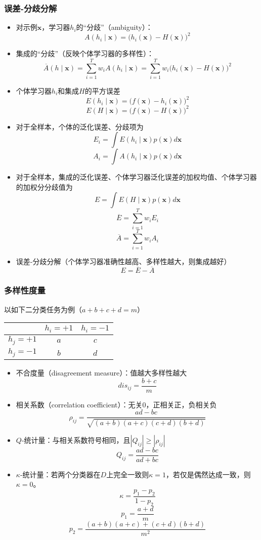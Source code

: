 \documentclass{ctexart}
\begin{document}
 					\subsubsection{误差-分歧分解}
 						\begin{itemize}
 							\item 对示例$\bm{x}$，学习器$h_i$的``分歧''（ambiguity）：\[A(h_i\mid\bm{x})=\big(h_i(\bm{x})-H(\bm{x})\big)^2\]
 							\item 集成的``分歧''（反映个体学习器的多样性）：\[\overline{A}(h\mid\bm{x})=\sum_{i=1}^{T}w_iA(h_i\mid\bm{x})=\sum_{i=1}^{T}w_i\big(h_i(\bm{x})-H(\bm{x})\big)^2\]
 							\item 个体学习器$h_i$和集成$H$的平方误差\[E(h_i\mid\bm{x})=\big(f(\bm{x})-h_i(\bm{x})\big)^2\]\[E(H\mid\bm{x})=\big(f(\bm{x})-H(\bm{x})\big)^2\]
 							\item 对于全样本，个体的泛化误差、分歧项为\[E_i=\int E(h_i\mid\bm{x})p(\bm{x})d\bm{x}\]\[A_i=\int A(h_i\mid\bm{x})p(\bm{x})d\bm{x}\]
 							\item 对于全样本，集成的泛化误差、个体学习器泛化误差的加权均值、个体学习器的加权分分歧值为\[E=\int E(H\mid\bm{x})p(\bm{x})d\bm{x}\]\[\overline{E}=\sum_{i=1}^{T}w_iE_i\]\[\overline{A}=\sum_{i=1}^{T}w_iA_i\]
 							\item 误差-分歧分解（个体学习器准确性越高、多样性越大，则集成越好）\[E=\overline{E}-\overline{A}\]
 						\end{itemize}
 					\subsubsection{多样性度量}
 					
 						以如下二分类任务为例（$a+b+c+d=m$）\begin{center}
 							\begin{tabular}{c|cc}
 								\hline
 								& $h_i=+1$ & $h_i=-1$ \\ \hline
 								$h_j=+1$ & $a$ & $c$ \\
 								$h_j=-1$ & $b$ & $d$ \\ \hline
 							\end{tabular}
 						\end{center}
 						\begin{itemize}
 							\item 不合度量（disagreement measure）：值越大多样性越大\[dis_{ij}=\frac{b+c}{m}\]
 							\item 相关系数（correlation coefficient）：无关0，正相关正，负相关负\[\rho_{ij}=\frac{ad-bc}{\sqrt{(a+b)(a+c)(c+d)(b+d)}}\]
 							\item $Q$-统计量：与相关系数符号相同，且$|Q_{ij}|\ge|\rho_{ij}|$\[Q_{ij}=\frac{ad-bc}{ad+bc}\]
 							\item $\kappa$-统计量：若两个分类器在$D$上完全一致则$\kappa=1$，若仅是偶然达成一致，则$\kappa=0$。\[\kappa=\frac{p_1-p_2}{1-p_2}\]\[p_1=\frac{a+d}{m}\]\[p_2=\frac{(a+b)(a+c)+(c+d)(b+d)}{m^2}\]
 						\end{itemize}
\end{document}

